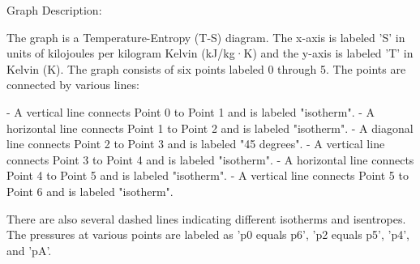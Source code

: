 Graph Description:

The graph is a Temperature-Entropy (T-S) diagram. The x-axis is labeled 'S' in units of kilojoules per kilogram Kelvin (kJ/kg·K) and the y-axis is labeled 'T' in Kelvin (K). The graph consists of six points labeled 0 through 5. The points are connected by various lines:

- A vertical line connects Point 0 to Point 1 and is labeled "isotherm".
- A horizontal line connects Point 1 to Point 2 and is labeled "isotherm".
- A diagonal line connects Point 2 to Point 3 and is labeled "45 degrees".
- A vertical line connects Point 3 to Point 4 and is labeled "isotherm".
- A horizontal line connects Point 4 to Point 5 and is labeled "isotherm".
- A vertical line connects Point 5 to Point 6 and is labeled "isotherm".

There are also several dashed lines indicating different isotherms and isentropes. The pressures at various points are labeled as 'p0 equals p6', 'p2 equals p5', 'p4', and 'pA'.